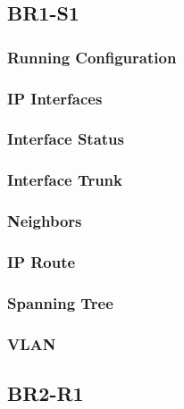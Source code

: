 \subsection{BR1-S1}
\subsubsection{Running Configuration}
%

\subsubsection{IP Interfaces}
%

\subsubsection{Interface Status}


\subsubsection{Interface Trunk}


\subsubsection{Neighbors}
%

\subsubsection{IP Route}


\subsubsection{Spanning Tree}


\subsubsection{VLAN}





\subsection{BR2-R1}
